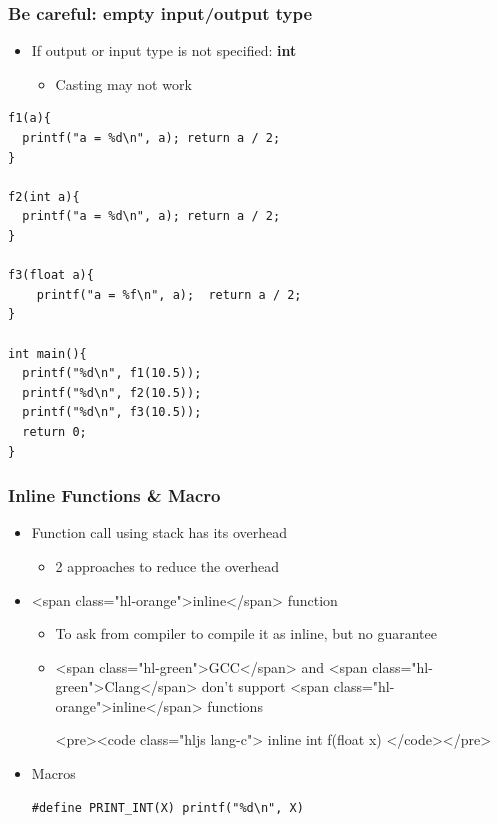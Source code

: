 \documentclass{../c-lecture}
\begin{document}
\begin{frame}[fragile]
  \frametitle{Be careful: empty input/output type}
  \begin{itemize}
    \item
      If output or input type is not specified:
      \textbf{\color{Orange} int}
    \begin{itemize}
      \item Casting may not work
    \end{itemize}
  \end{itemize}
  \begin{verbatim}
f1(a){
  printf("a = %d\n", a); return a / 2;
}

f2(int a){
  printf("a = %d\n", a); return a / 2;
}

f3(float a){
    printf("a = %f\n", a);  return a / 2;
}

int main(){
  printf("%d\n", f1(10.5));
  printf("%d\n", f2(10.5));
  printf("%d\n", f3(10.5));
  return 0;
}
  \end{verbatim}
\end{frame}

\begin{frame}
  \frametitle{Inline Functions \& Macro}
  \begin{itemize}
    \item Function call using stack has its overhead
    \begin{itemize}
      \item 2 approaches to reduce the overhead
    \end{itemize}
    \item <span class="hl-orange">inline</span> function
    \begin{itemize}
      \item To ask from compiler to compile it as inline, but no guarantee
      \item
        <span class="hl-green">GCC</span> and
        <span class="hl-green">Clang</span> don't support
        <span class="hl-orange">inline</span> functions

      <pre><code class="hljs lang-c">
inline int f(float x)
      </code></pre>
    \end{itemize}
    \item Macros
    \begin{verbatim}
#define PRINT_INT(X) printf("%d\n", X)
    \end{verbatim}
  \end{itemize}
\end{frame}
\end{document}
